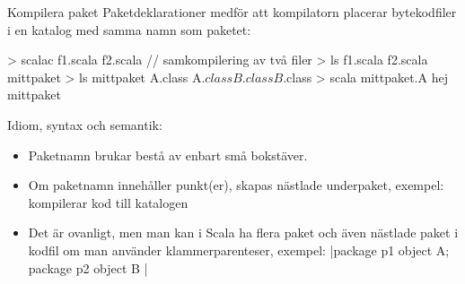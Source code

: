 \begin{Slide}{Kompilera paket}\SlideFontSmall
Paketdeklarationer medför att kompilatorn placerar bytekodfiler i en katalog med samma namn som paketet:
\begin{REPL}
> scalac f1.scala f2.scala     // samkompilering av två filer
> ls
f1.scala  f2.scala  mittpaket
> ls mittpaket
A.class  A$.class  B.class  B$.class
> scala mittpaket.A
hej mittpaket
\end{REPL}
\pause
Idiom, syntax och semantik:
\begin{itemize}
  \item Paketnamn brukar bestå av enbart små bokstäver.
  \item Om paketnamn innehåller punkt(er), skapas nästlade underpaket, exempel:   kompilerar kod till katalogen 
  \item Det är ovanligt, men man kan i Scala ha flera paket och även nästlade paket i  kodfil
  om man använder klammerparenteser, exempel:
  \code|package p1 { object A; package p2 { object B }}|
\end{itemize}
\end{Slide}





